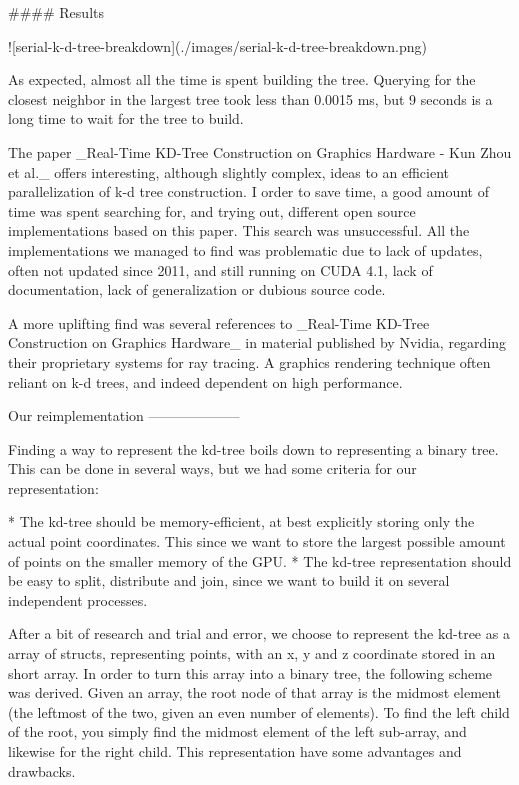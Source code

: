 #### Results

![serial-k-d-tree-breakdown](./images/serial-k-d-tree-breakdown.png)

As expected, almost all the time is spent building the tree. Querying for the closest neighbor in the largest tree took less than 0.0015 ms, but 9 seconds is a long time to wait for the tree to build.

The paper _Real-Time KD-Tree Construction on Graphics Hardware - Kun Zhou et al._ offers interesting, although slightly complex, ideas to an efficient parallelization of k-d tree construction. I order to save time, a good amount of time was spent searching for, and trying out, different open source implementations based on this paper. This search was unsuccessful. All the implementations we managed to find was problematic due to lack of updates, often not updated since 2011, and still running on CUDA 4.1, lack of documentation, lack of generalization or dubious source code.

A more uplifting find was several references to _Real-Time KD-Tree Construction on Graphics Hardware_ in material published by Nvidia, regarding their proprietary systems for ray tracing. A graphics rendering technique often reliant on k-d trees, and indeed dependent on high performance.


Our reimplementation
--------------------

Finding a way to represent the kd-tree boils down to representing a binary tree. This can be done in several ways, but we had some criteria for our representation:

* The kd-tree should be memory-efficient, at best explicitly storing only the actual point coordinates. This since we want to store the largest possible amount of points on the smaller memory of the GPU.
* The kd-tree representation should be easy to split, distribute and join, since we want to build it on several independent processes.

After a bit of research and trial and error, we choose to represent the kd-tree as a array of structs, representing points, with an x, y and z coordinate stored in an short array. In order to turn this array into a binary tree, the following scheme was derived. Given an array, the root node of that array is the midmost element (the leftmost of the two, given an even number of elements). To find the left child of the root, you simply find the midmost element of the left sub-array, and likewise for the right child. This representation have some advantages and drawbacks.

